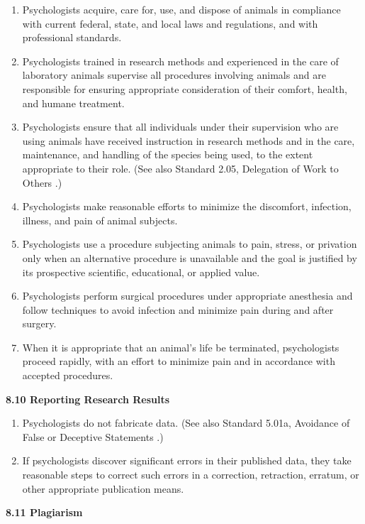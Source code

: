 \documentclass[
]{krantz}
\begin{document}
\begin{enumerate}
\def\labelenumi{(\alph{enumi})}
\item
  Psychologists acquire, care for, use, and dispose of animals in compliance with current federal, state, and local laws and regulations, and with professional standards.
\item
  Psychologists trained in research methods and experienced in the care of laboratory animals supervise all procedures involving animals and are responsible for ensuring appropriate consideration of their comfort, health, and humane treatment.
\item
  Psychologists ensure that all individuals under their supervision who are using animals have received instruction in research methods and in the care, maintenance, and handling of the species being used, to the extent appropriate to their role. (See also Standard 2.05, Delegation of Work to Others .)
\item
  Psychologists make reasonable efforts to minimize the discomfort, infection, illness, and pain of animal subjects.
\item
  Psychologists use a procedure subjecting animals to pain, stress, or privation only when an alternative procedure is unavailable and the goal is justified by its prospective scientific, educational, or applied value.
\item
  Psychologists perform surgical procedures under appropriate anesthesia and follow techniques to avoid infection and minimize pain during and after surgery.
\item
  When it is appropriate that an animal's life be terminated, psychologists proceed rapidly, with an effort to minimize pain and in accordance with accepted procedures.
\end{enumerate}

\textbf{8.10 Reporting Research Results}

\begin{enumerate}
\def\labelenumi{(\alph{enumi})}
\item
  Psychologists do not fabricate data. (See also Standard 5.01a, Avoidance of False or Deceptive Statements .)
\item
  If psychologists discover significant errors in their published data, they take reasonable steps to correct such errors in a correction, retraction, erratum, or other appropriate publication means.
\end{enumerate}

\textbf{8.11 Plagiarism}
\end{document}
